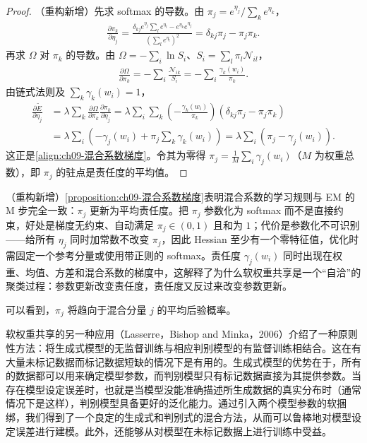 \documentclass[../../main.tex]{subfiles}
\begin{document}
\begin{proof}
（重构新增）先求 softmax 的导数。由 $\pi_{j}=e^{\eta_{j}}/\sum_{k}e^{\eta_{k}}$，
\begin{align*}
\frac{\partial\pi_{k}}{\partial\eta_{j}}=\frac{\delta_{kj}e^{\eta_{j}}\sum_{l}e^{\eta_{l}}-e^{\eta_{k}}e^{\eta_{j}}}{\left(\sum_{l}e^{\eta_{l}}\right)^{2}}=\delta_{kj}\pi_{j}-\pi_{j}\pi_{k}.
\end{align*}
再求 $\Omega$ 对 $\pi_{k}$ 的导数。由 $\Omega=-\sum_{i}\ln S_{i}$、$S_{i}=\sum_{l}\pi_{l}\mathcal{N}_{il}$，
\begin{align*}
\frac{\partial\Omega}{\partial\pi_{k}}=-\sum_{i}\frac{\mathcal{N}_{ik}}{S_{i}}=-\sum_{i}\frac{\gamma_{k}(w_{i})}{\pi_{k}}.
\end{align*}
由链式法则及 $\sum_{k}\gamma_{k}(w_{i})=1$，
\begin{align*}
\frac{\partial\widetilde{E}}{\partial\eta_{j}}
&=\lambda\sum_{k}\frac{\partial\Omega}{\partial\pi_{k}}\frac{\partial\pi_{k}}{\partial\eta_{j}}
=\lambda\sum_{i}\sum_{k}\left(-\frac{\gamma_{k}(w_{i})}{\pi_{k}}\right)\left(\delta_{kj}\pi_{j}-\pi_{j}\pi_{k}\right)\\
&=\lambda\sum_{i}\left(-\gamma_{j}(w_{i})+\pi_{j}\sum_{k}\gamma_{k}(w_{i})\right)
=\lambda\sum_{i}\left(\pi_{j}-\gamma_{j}(w_{i})\right).
\end{align*}
这正是\eqref{align:ch09-混合系数梯度}。令其为零得 $\pi_{j}=\frac{1}{M}\sum_{i}\gamma_{j}(w_{i})$（$M$ 为权重总数），即 $\pi_{j}$ 的驻点是责任度的平均值。
\end{proof}

\begin{remark}（重构新增）\cref{proposition:ch09-混合系数梯度}表明混合系数的学习规则与 EM 的 M 步完全一致：$\pi_{j}$ 更新为平均责任度。把 $\pi_{j}$ 参数化为 softmax 而不是直接约束，好处是梯度无约束、自动满足 $\pi_{j}\in(0,1)$ 且和为 $1$；代价是参数化不可识别——给所有 $\eta_{j}$ 同时加常数不改变 $\pi_{j}$，因此 Hessian 至少有一个零特征值，优化时需固定一个参考分量或使用带正则的 softmax。责任度 $\gamma_{j}(w_{i})$ 同时出现在权重、均值、方差和混合系数的梯度中，这解释了为什么软权重共享是一个“自洽”的聚类过程：参数更新改变责任度，责任度又反过来改变参数更新。
\end{remark}

可以看到，$\pi_{j}$ 将趋向于混合分量 $j$ 的平均后验概率。

软权重共享的另一种应用（Lasserre，Bishop and Minka，2006）介绍了一种原则性方法：将生成式模型的无监督训练与相应判别模型的有监督训练相结合。这在有大量未标记数据而标记数据短缺的情况下是有用的。生成式模型的优势在于，所有的数据都可以用来确定模型参数，而判别模型只有标记数据直接为其提供参数。当存在模型设定误差时，也就是当模型没能准确描述所生成数据的真实分布时（通常情况下是这样），判别模型具备更好的泛化能力。通过引入两个模型参数的软捆绑，我们得到了一个良定的生成式和判别式的混合方法，从而可以鲁棒地对模型设定误差进行建模。此外，还能够从对模型在未标记数据上进行训练中受益。
\end{document}
